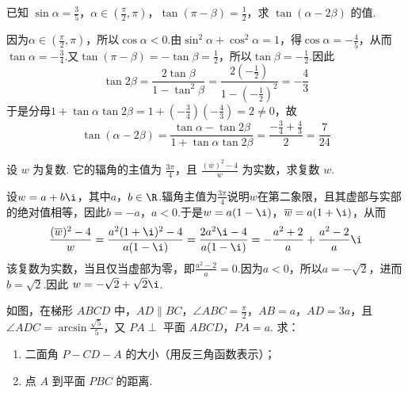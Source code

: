 \begin{problem}
已知 \(\sin \alpha = \frac{3}{5}\)，\(\alpha \in \left(\frac{\pi}{2}, \pi\right)\)，\(\tan(\pi - \beta) = \frac{1}{2}\)，求 \(\tan(\alpha - 2\beta)\) 的值.
\end{problem}

\begin{solution}
因为\(\alpha\in\left(\frac{\pi}{2},\pi\right)\)，所以\(\cos\alpha<0\).由\(\sin^2\alpha+\cos^2\alpha=1\)，得\(\cos\alpha=-\frac{4}{5}\)，从而\(\tan\alpha=-\frac{3}{4}\).又\(\tan(\pi-\beta)=-\tan\beta=\frac{1}{2}\)，所以\(\tan\beta=-\frac{1}{2}\).因此
\[
\tan2\beta=\frac{2\tan\beta}{1-\tan^2\beta}=\frac{2\left(-\frac{1}{2}\right)}{1-\left(-\frac{1}{2}\right)^2}=-\frac{4}{3}
\]
于是分母\(1+\tan\alpha\tan2\beta=1+\left(-\frac{3}{4}\right)\left(-\frac{4}{3}\right)=2\ne0\)，故
\[
\tan(\alpha-2\beta)=\frac{\tan\alpha-\tan2\beta}{1+\tan\alpha\tan2\beta}=\frac{-\frac{3}{4}+\frac{4}{3}}{2}=\frac{7}{24}
\]
\end{solution}

\begin{problem}
设 \(w\) 为复数. 它的辐角的主值为 \(\frac{3\pi}{4}\)，且 \(\frac{\left(\overline{w}\right)^2 - 4}{w}\) 为实数，求复数 \(w\).
\end{problem}

\begin{solution}
设\(w=a+b\i\)，其中\(a\)，\(b\in\R\).辐角主值为\(\frac{3\pi}{4}\)说明\(w\)在第二象限，且其虚部与实部的绝对值相等，因此\(b=-a\)，\(a<0\).于是\(w=a(1-\i)\)，\(\overline w=a(1+\i)\)，从而
\[
\frac{(\overline w)^2-4}{w}=\frac{a^2(1+\i)^2-4}{a(1-\i)}=\frac{2a^2\i-4}{a(1-\i)}=-\frac{a^2+2}{a}+\frac{a^2-2}{a}\i
\]
该复数为实数，当且仅当虚部为零，即\(\frac{a^2-2}{a}=0\).因为\(a<0\)，所以\(a=-\sqrt2\)，进而\(b=\sqrt2\).因此
\(w=-\sqrt2+\sqrt2\i\).
\end{solution}

\begin{problem}
如图，在梯形 \(ABCD\) 中，\(AD \parallel BC\)，\(\angle ABC = \frac{\pi}{2}\)，\(AB = a\)，\(AD = 3a\)，且 \(\angle ADC = \arcsin \frac{\sqrt{5}}{5}\)，又 \(PA \perp\) 平面 \(ABCD\)，\(PA = a\). 求：
\begin{enumerate}
\item 二面角 \(P-CD-A\) 的大小（用反三角函数表示）；
\item 点 \(A\) 到平面 \(PBC\) 的距离.
\end{enumerate}

\end{problem}

